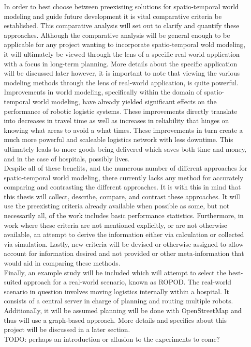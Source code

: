   In order to best choose between preexisting solutions for spatio-temporal
  world modeling and guide future development it is vital comparative criteria be
  established. This comparative analysis will set out to clarify and quantify
  these approaches. Although the comparative analysis will be general enough to be
  applicable for any project wanting to incorporate spatio-temporal wold modeling,
  it will ultimately be viewed through the lens of a specific real-world application
  with a focus in long-term planning. More details about the specific application
  will be discussed later however, it is important to note that viewing the
  various modeling methods through the lens of real-world application, is quite
  powerful. \\

  Improvements in world modeling, specifically within the domain of
  spatio-temporal world modeling, have already yielded significant effects
  on the performance of robotic logistic systems. These improvements directly
  translate into decreases in travel time as well as increases in reliability
  that hinges on knowing what areas to avoid a what times. These improvements in
  turn create a much more powerful and scaleable logistics network with less
  downtime. This ultimately leads to more goods being delivered which saves
  both time and money, and in the case of hospitals, possibly lives. \\

  Despite all of these benefits, and the numerous number of different approaches
  for spatio-temporal world modeling, there currently lacks any method for
  accurately comparing and contrasting the different approaches. It is with this
  in mind that this thesis will collect, describe, compare, and contrast these
  approaches. It will use the preexisting criteria already available when possible as some,
  but not necessarily all, of the work includes basic performance statistics.
  Furthermore, in work where these criteria are not mentioned explicitly, or are
  not otherwise available, an attempt to derive the information either via
  calculation or collected via simulation. Lastly, new criteria will be devised
  or otherwise assigned to allow account for information desired and not provided
  or other meta-information that would aid in comparing these methods. \\

  Finally, an example study will be included which will attempt to select the
  best-suited approach for a real-world scenario, known as ROPOD. The real-world
  scenario in question involves moving logistics internally within a hospital.
  It consists of a central server in charge of planning and routing multiple
  robots. Additionally, it will be assumed planning will be done with
  OpenStreetMap and thus will use a graph-based approach. More details and
  specifics about this project will be discussed in a later section. \\


  TODO: perhaps an introduction or allusion to the experiments to come?


